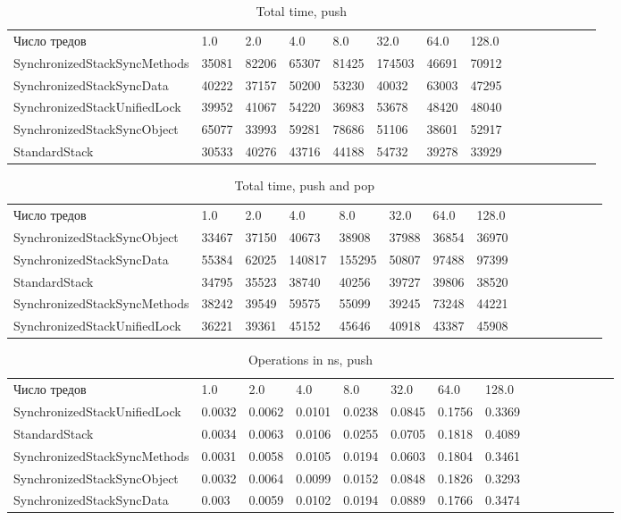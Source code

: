 \documentclass[12pt]{article}
\begin{document}
  \begin{table}[ht!]
	    \caption{Total time, push}
	    \label{sandp}
	    \begin{tabular}{lllllllllllllll}
		Число тредов & 1.0 & 2.0 & 4.0 & 8.0 & 32.0 & 64.0 & 128.0\\
SynchronizedStackSyncMethods & 35081 & 82206 & 65307 & 81425 & 174503 & 46691 & 70912\\
SynchronizedStackSyncData & 40222 & 37157 & 50200 & 53230 & 40032 & 63003 & 47295\\
SynchronizedStackUnifiedLock & 39952 & 41067 & 54220 & 36983 & 53678 & 48420 & 48040\\
SynchronizedStackSyncObject & 65077 & 33993 & 59281 & 78686 & 51106 & 38601 & 52917\\
StandardStack & 30533 & 40276 & 43716 & 44188 & 54732 & 39278 & 33929\\

	    \end{tabular}
	\end{table}
	
 \begin{table}[ht!]
	    \caption{Total time, push and pop}
	    \label{sandp}
	    \begin{tabular}{lllllllllllllll}
		Число тредов & 1.0 & 2.0 & 4.0 & 8.0 & 32.0 & 64.0 & 128.0\\
SynchronizedStackSyncObject & 33467 & 37150 & 40673 & 38908 & 37988 & 36854 & 36970\\
SynchronizedStackSyncData & 55384 & 62025 & 140817 & 155295 & 50807 & 97488 & 97399\\
StandardStack & 34795 & 35523 & 38740 & 40256 & 39727 & 39806 & 38520\\
SynchronizedStackSyncMethods & 38242 & 39549 & 59575 & 55099 & 39245 & 73248 & 44221\\
SynchronizedStackUnifiedLock & 36221 & 39361 & 45152 & 45646 & 40918 & 43387 & 45908\\

	    \end{tabular}
	\end{table}
	
 \begin{table}[ht!]
	    \caption{Operations in ns, push}
	    \label{sandp}
	    \begin{tabular}{lllllllllllllll}
		Число тредов & 1.0 & 2.0 & 4.0 & 8.0 & 32.0 & 64.0 & 128.0\\
SynchronizedStackUnifiedLock & 0.0032 & 0.0062 & 0.0101 & 0.0238 & 0.0845 & 0.1756 & 0.3369\\
StandardStack & 0.0034 & 0.0063 & 0.0106 & 0.0255 & 0.0705 & 0.1818 & 0.4089\\
SynchronizedStackSyncMethods & 0.0031 & 0.0058 & 0.0105 & 0.0194 & 0.0603 & 0.1804 & 0.3461\\
SynchronizedStackSyncObject & 0.0032 & 0.0064 & 0.0099 & 0.0152 & 0.0848 & 0.1826 & 0.3293\\
SynchronizedStackSyncData & 0.003 & 0.0059 & 0.0102 & 0.0194 & 0.0889 & 0.1766 & 0.3474\\
	    \end{tabular}
	\end{table}
	
\end{document}
